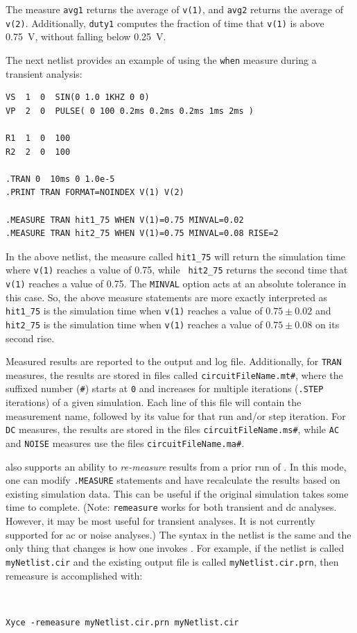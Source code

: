 The measure \texttt{avg1} returns the average of \texttt{v(1)}, and
\texttt{avg2} returns the average of \texttt{v(2)}. Additionally,
\texttt{duty1} computes the fraction of time that \texttt{v(1)} is above
0.75~V, without falling below 0.25~V. 

The next netlist provides an example of using the \texttt{when} measure
during a transient analysis:

\begin{verbatim}
VS  1  0  SIN(0 1.0 1KHZ 0 0)
VP  2  0  PULSE( 0 100 0.2ms 0.2ms 0.2ms 1ms 2ms )

R1  1  0  100
R2  2  0  100

.TRAN 0  10ms 0 1.0e-5
.PRINT TRAN FORMAT=NOINDEX V(1) V(2) 

.MEASURE TRAN hit1_75 WHEN V(1)=0.75 MINVAL=0.02
.MEASURE TRAN hit2_75 WHEN V(1)=0.75 MINVAL=0.08 RISE=2

\end{verbatim}

In the above netlist, the measure called \texttt{hit1\_75} will return the
simulation time where \texttt{v(1)} reaches a value of 0.75, while {\tt
hit2\_75} returns the second time that \texttt{v(1)} reaches a value of 0.75.
The \texttt{MINVAL} option acts at an absolute tolerance in this case. So, the
above measure statements are more exactly interpreted as \texttt{hit1\_75} is
the simulation time when \texttt{v(1)} reaches a value of $0.75 \pm 0.02$ and
\texttt{hit2\_75} is the simulation time when {\tt v(1)} reaches a value of
$0.75 \pm 0.08$ on its second rise.

Measured results are reported to the output and log file.  Additionally, for \texttt{TRAN}
measures, the results are stored in files called \texttt{circuitFileName.mt\#}, where
the suffixed number (\texttt{\#}) starts at \texttt{0} and increases for multiple
iterations (\texttt{.STEP} iterations) of a given simulation. Each line of this file
will contain the measurement name, followed by its value for that run and/or step 
iteration.  For \texttt{DC} measures, the results are stored in the files
\texttt{circuitFileName.ms\#}, while \texttt{AC} and \texttt{NOISE} measures
use the files \texttt{circuitFileName.ma\#}.

\Xyce{} also supports an ability to {\it re-measure} results from a prior run of \Xyce{}.
In this mode, one can modify \texttt{.MEASURE} statements and have \Xyce{} recalculate 
the results based on existing simulation data.  This can be useful if the original simulation 
takes some time to complete.  (Note: \texttt{remeasure} works for both transient and 
dc analyses.  However, it may be most useful for transient analyses.  It is not currently
supported for ac or noise analyses.)  The syntax in the netlist is the same and the only thing that
changes is how one invokes \Xyce{}.  For example, if the netlist is called {\tt myNetlist.cir}
and the existing output file is called {\tt myNetlist.cir.prn}, then remeasure is accomplished with:
{\tt
\begin{verbatim}
Xyce -remeasure myNetlist.cir.prn myNetlist.cir
\end{verbatim}
}

